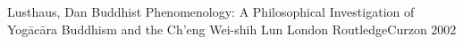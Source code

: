Lusthaus, Dan Buddhist Phenomenology: A Philosophical Investigation of Yogācāra Buddhism and the Ch'eng Wei-shih Lun London RoutledgeCurzon 2002